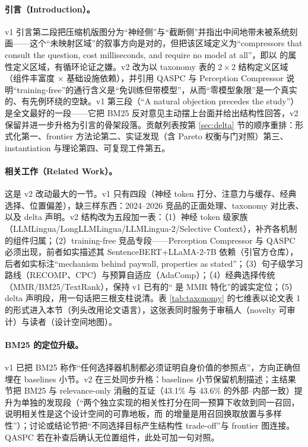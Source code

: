 \paragraph{引言（Introduction）。}
v1 引言第二段把压缩机版图分为``神经侧''与``截断侧''并指出中间地带未被系统刻画——这个``未映射区域''的叙事方向是对的，但把该区域定义为``compressors that consult the question, cost milliseconds, and require no model at all''，即以 \sieve{} 的属性定义区域，有循环论证之嫌。v2 改为以 taxonomy 表的 $2\times2$ 结构定义区域（组件丰富度 $\times$ 基础设施依赖），并引用 QASPC 与 Perception Compressor 说明``training-free''的通行含义是``免训练但带模型''，从而``零模型象限''是一个真实的、有先例环绕的空缺。v1 第三段（``A natural objection precedes the study''）是全文最好的一段——它把 BM25 反对意见主动摆上台面并给出结构性回答，v2 保留并进一步升格为引言的骨架段落。贡献列表按第 \ref{sec:delta} 节的顺序重排：形式化第一、frontier 方法论第二、实证发现（含 Pareto 权衡与门对照）第三、instantiation 与理论第四、可复现工件第五。

\paragraph{相关工作（Related Work）。}
这是 v2 改动最大的一节。v1 只有四段（神经 token 打分、注意力与缓存、经典选择、位置偏差），缺三样东西：2024--2026 竞品的正面处理、taxonomy 对比表、以及 delta 声明。v2 结构改为五段加一表：（1）神经 token 级家族（LLMLingua/LongLLMLingua/LLMLingua-2/Selective Context），补齐各机制的组件归属；（2）training-free 竞品专段——Perception Compressor 与 QASPC 必须出现，前者如实描述其 SentenceBERT+LLaMA-2-7B 依赖（引官方仓库），后者如实标注``mechanism behind paywall, properties as stated''；（3）句子级学习路线（RECOMP、CPC）与预算自适应（AdaComp）；（4）经典选择传统（MMR/BM25/TextRank），保持 v1 已有的``\sieve{} 是 MMR 特化''的诚实定位；（5）delta 声明段，用一句话把三根支柱说清。表 \ref{tab:taxonomy} 的七维表以论文表 1 的形式进入本节（列头改用论文语言），这张表同时服务于审稿人（novelty 可审计）与读者（设计空间地图）。

\paragraph{BM25 的定位升级。}
v1 已把 BM25 称作``任何选择器机制都必须证明自身价值的参照点''，方向正确但埋在 baselines 小节。v2 在三处同步升格：baselines 小节保留机制描述；主结果节把 BM25 与 relevance-only 消融的互证（43.1\% 与 43.6\% 的外部--内部一致）提升为单独的发现段（``两个独立实现的相关性打分在同一预算下收敛到同一召回，说明相关性是这个设计空间的可靠地板，而 \sieve{} 的增量是用召回换取放置与多样性''）；讨论或结论节把``不同选择目标产生结构性 trade-off''与 frontier 图连接。QASPC 若在补查后确认无位置组件，此处可加一句对照。

